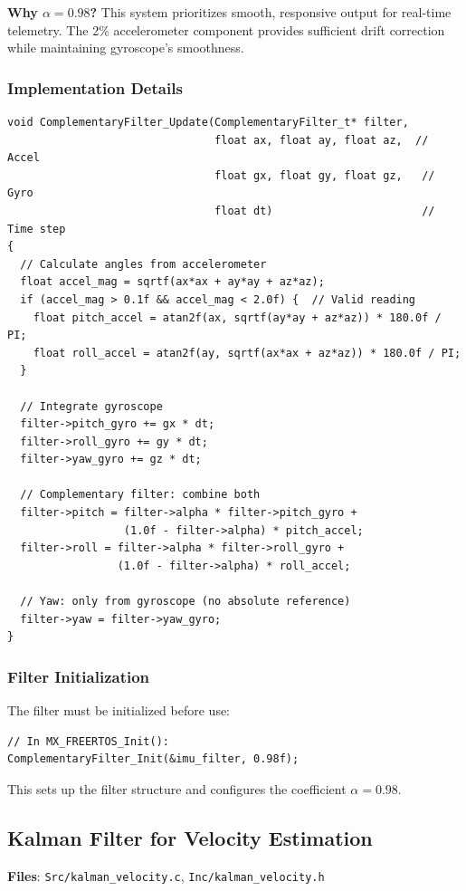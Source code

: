 \documentclass[11pt,a4paper]{article}
\begin{document}
\textbf{Why $\alpha = 0.98$?} This system prioritizes smooth, responsive output for real-time telemetry. The 2\% accelerometer component provides sufficient drift correction while maintaining gyroscope's smoothness.

\subsubsection{Implementation Details}
\begin{lstlisting}[caption=Complementary Filter Update Function, label=lst:compupdate]
void ComplementaryFilter_Update(ComplementaryFilter_t* filter,
                                float ax, float ay, float az,  // Accel
                                float gx, float gy, float gz,   // Gyro
                                float dt)                       // Time step
{
  // Calculate angles from accelerometer
  float accel_mag = sqrtf(ax*ax + ay*ay + az*az);
  if (accel_mag > 0.1f && accel_mag < 2.0f) {  // Valid reading
    float pitch_accel = atan2f(ax, sqrtf(ay*ay + az*az)) * 180.0f / PI;
    float roll_accel = atan2f(ay, sqrtf(ax*ax + az*az)) * 180.0f / PI;
  }
  
  // Integrate gyroscope
  filter->pitch_gyro += gx * dt;
  filter->roll_gyro += gy * dt;
  filter->yaw_gyro += gz * dt;
  
  // Complementary filter: combine both
  filter->pitch = filter->alpha * filter->pitch_gyro + 
                  (1.0f - filter->alpha) * pitch_accel;
  filter->roll = filter->alpha * filter->roll_gyro + 
                 (1.0f - filter->alpha) * roll_accel;
  
  // Yaw: only from gyroscope (no absolute reference)
  filter->yaw = filter->yaw_gyro;
}
\end{lstlisting}

\subsubsection{Filter Initialization}
The filter must be initialized before use:

\begin{lstlisting}[caption=Filter Initialization, label=lst:compinitcode]
// In MX_FREERTOS_Init():
ComplementaryFilter_Init(&imu_filter, 0.98f);
\end{lstlisting}

This sets up the filter structure and configures the coefficient $\alpha = 0.98$.

\subsection{Kalman Filter for Velocity Estimation}
\textbf{Files}: \texttt{Src/kalman\_velocity.c}, \texttt{Inc/kalman\_velocity.h}
\end{document}
